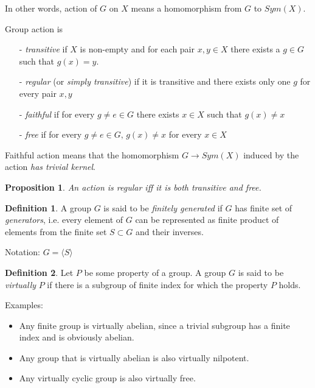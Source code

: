 \documentclass[a4paper,12pt]{amsart}
\newtheorem{proposition}[theorem]{Proposition}
\theoremstyle{definition}
\newtheorem{definition}{Definition}
\begin{document}
	
	In other words, action of $G$ on $X$ means a homomorphism from $G$ to $Sym(X)$. 

	Group action is
	
	\begin{itemize}
		\item[-] \textit{transitive} if $X$ is non-empty and for each pair $x,y \in X$ there exists a $g \in G$ such that $g(x) = y$.
		\item[-] \textit{regular} (or \textit{simply transitive}) if it is transitive and there exists only one $g$ for every pair $x, y$ 
		\item[-] \textit{faithful} if for every $g \neq e \in G$ there exists $x \in X$ such that $g(x) \neq x$
		\item[-] \textit{free} if for every $g \neq e \in G, \, g(x) \neq x$ for every $x \in X$ 
	\end{itemize}
	

	Faithful action means that the homomorphism $G \rightarrow Sym(X)$ induced by the action \textit{has trivial kernel}. 
	
	\begin{proposition}
		An action is regular iff it is both transitive and free. 
	\end{proposition}
	
	
	\begin{definition}
		A group $G$ is said to be \textit{finitely generated} if $G$ has finite set of \textit{generators}, i.e. every element of $G$ can be represented as finite product of elements from the finite set $S \subset G$ and their inverses. 
		
		Notation: $G = \langle S \rangle$ 
	\end{definition}
	
	
	
	
	\begin{definition}
		Let $P$ be some property of a group. A group $G$ is said to be \textit{virtually} $P$ if there is a subgroup of finite index for which the property $P$ holds. 
		
	\end{definition}
	
	Examples: 
	
	\begin{itemize}
		\item Any finite group is virtually abelian, since a trivial subgroup has a finite index and is obviously abelian. 
		
		\item Any group that is virtually abelian is also virtually nilpotent. 
		
		\item Any virtually cyclic group is also virtually free. 
		
	\end{itemize}
	
\end{document}
